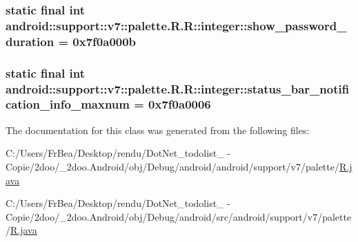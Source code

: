 \hypertarget{classandroid_1_1support_1_1v7_1_1palette_1_1_r_1_1integer_c504fbbc867daeb2f114eb212a83e264}{
\subsubsection[{show\_\-password\_\-duration}]{\setlength{\rightskip}{0pt plus 5cm}static final int android::support::v7::palette.R.R::integer::show\_\-password\_\-duration = 0x7f0a000b}}
\label{classandroid_1_1support_1_1v7_1_1palette_1_1_r_1_1integer_c504fbbc867daeb2f114eb212a83e264}


\hypertarget{classandroid_1_1support_1_1v7_1_1palette_1_1_r_1_1integer_64fb4a73d8685666c775f684c018f18f}{
\subsubsection[{status\_\-bar\_\-notification\_\-info\_\-maxnum}]{\setlength{\rightskip}{0pt plus 5cm}static final int android::support::v7::palette.R.R::integer::status\_\-bar\_\-notification\_\-info\_\-maxnum = 0x7f0a0006}}
\label{classandroid_1_1support_1_1v7_1_1palette_1_1_r_1_1integer_64fb4a73d8685666c775f684c018f18f}




The documentation for this class was generated from the following files:\begin{CompactItemize}
\item 
C:/Users/FrBea/Desktop/rendu/DotNet\_\-todolist\_ - Copie/2doo/\_\-2doo.Android/obj/Debug/android/android/support/v7/palette/\hyperlink{android_2support_2v7_2palette_2_r_8java}{R.java}\item 
C:/Users/FrBea/Desktop/rendu/DotNet\_\-todolist\_ - Copie/2doo/\_\-2doo.Android/obj/Debug/android/src/android/support/v7/palette/\hyperlink{src_2android_2support_2v7_2palette_2_r_8java}{R.java}\end{CompactItemize}
